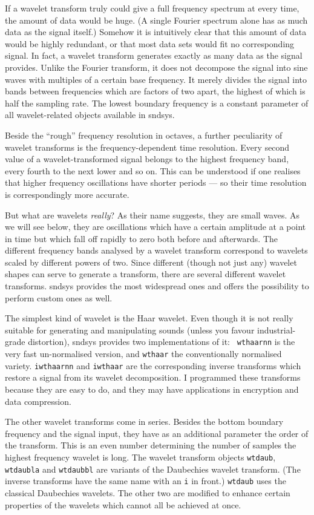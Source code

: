 \documentclass{article}
\def\s{{\sc sndsys} }
\def\sn{{\sc sndsys}}
\begin{document}
If a wavelet transform truly could give a full frequency spectrum at every
time, the amount of data would be huge.  (A single Fourier spectrum alone has
as much data as the signal itself.)  Somehow it is intuitively clear that this
amount of data would be highly redundant, or that most data sets would fit no
corresponding signal.  In fact, a wavelet transform generates exactly as many
data as the signal provides.  Unlike the Fourier transform, it does not
decompose the signal into sine waves with multiples of a certain base
frequency.  It merely divides the signal into bands between frequencies which
are factors of two apart, the highest of which is half the sampling rate.  The
lowest boundary frequency is a constant parameter of all wavelet-related
objects available in \sn.

Beside the ``rough'' frequency resolution in octaves, a further peculiarity
of wavelet transforms is the frequency-dependent time resolution.  Every second
value of a wavelet-transformed signal belongs to the highest frequency band,
every fourth to the next lower and so on.  This can be understood if one
realises that higher frequency oscillations have shorter periods --- so their
time resolution is correspondingly more accurate.

But what are wavelets {\it really}?  As their name suggests, they are small
waves.  As we will see below, they are oscillations which
have a certain amplitude at a point in time but which fall off rapidly to zero
both before and afterwards.  The different frequency bands analysed by a
wavelet transform correspond to wavelets scaled by different powers of two.
Since different (though not just any) wavelet shapes can serve to generate a
transform, there are several different wavelet transforms.  \s provides the
most widespread ones and offers the possibility to perform custom ones as well.

The simplest kind of wavelet is the Haar wavelet.  Even though it is not really
suitable for generating and manipulating sounds (unless you favour
industrial-grade distortion), \s provides two implementations of it: {\tt
wthaarnn} is the very fast un-normalised version, and {\tt wthaar} the
conventionally normalised variety.  {\tt iwthaarnn} and {\tt iwthaar} are the
corresponding inverse transforms which restore a signal from its wavelet
decomposition.  I programmed these transforms because they are easy to do, and
they may have applications in encryption and data compression.

The other wavelet transforms come in series.  Besides the bottom boundary
frequency and the signal input, they have as an additional parameter the order
of the transform.  This is an even number determining the number of samples the
highest frequency wavelet is long.  The wavelet transform objects {\tt wtdaub},
{\tt wtdaubla} and {\tt wtdaubbl} are variants of the Daubechies wavelet
transform.  (The inverse transforms have the same name with an {\tt i} in
front.)  {\tt wtdaub} uses the classical Daubechies wavelets.  The other two
are modified to enhance certain properties of the wavelets which cannot all be
achieved at once.
\end{document}
